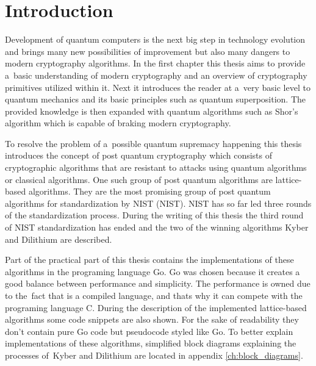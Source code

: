 \chapter*{Introduction}
{}

Development of quantum computers is the next big step in technology evolution and brings many new possibilities of improvement but also many dangers to modern cryptography algorithms. In the first chapter this thesis aims to provide a~basic understanding of modern cryptography and an overview of  cryptography primitives utilized within it. Next it introduces the reader at a~very basic level to quantum mechanics and its basic principles such as quantum superposition. The provided knowledge is then expanded with quantum algorithms such as Shor's algorithm which is capable of braking modern cryptography.

To resolve the problem of a~possible quantum supremacy happening this thesis introduces the concept of post quantum cryptography which consists of cryptographic algorithms that are resistant to attacks using quantum algorithms or classical algorithms. One such group of post quantum algorithms are lattice-based algorithms. They are the most promising group of post quantum algorithms for standardization by NIST (\acl{NIST}). NIST has so far led three rounds of the standardization process. During the writing of this thesis the third round of NIST standardization has ended and the two of the winning algorithms Kyber and Dilithium are described.

Part of the practical part of this thesis contains the implementations of these algorithms in the programing language Go. Go was chosen because it creates a good balance between performance and simplicity. The performance is owned due to the~fact that is a compiled language, and thats why it can compete with the programing language C. During the description of the implemented lattice-based algorithms some code snippets are also shown. For the sake of readability they don't contain pure Go code but pseudocode styled like Go. To better explain implementations of these algorithms, simplified block diagrams explaining the processes of~Kyber and Dilithium are located in appendix \ref{ch:block_diagrams}.

